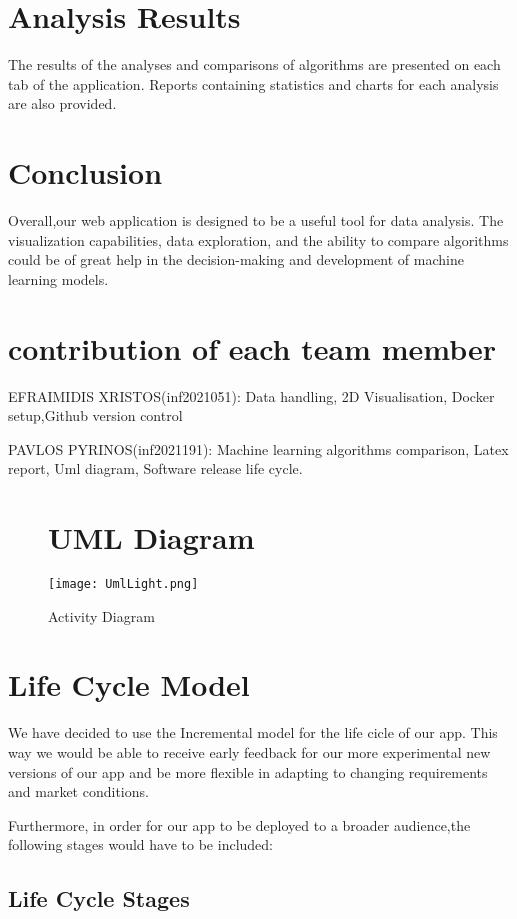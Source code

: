 \documentclass{article}
\begin{document}
\section{Analysis Results}
The results of the analyses and comparisons of algorithms are presented on each tab of the application. Reports containing statistics and charts for each analysis are also provided.

\section{Conclusion}
Overall,our web application is designed to be a useful tool for data analysis. The visualization capabilities, data exploration, and the ability to compare algorithms could be of great help in the decision-making and development of machine learning models.

\section{contribution of each team member}
EFRAIMIDIS XRISTOS(inf2021051): Data handling, 2D Visualisation, Docker setup,Github version control

PAVLOS PYRINOS(inf2021191): Machine learning algorithms comparison, Latex report, Uml diagram,
 Software release life cycle.

\begin{figure}[htbp]
    \section{UML Diagram}
    \centering
    \texttt{[image: UmlLight.png]}
    \caption{Activity Diagram}
    \label{fig:example}
\end{figure}

\section{Life Cycle Model}
We have decided to use the Incremental model for the life cicle of our app. This way we would be able to receive early feedback for our more experimental new versions of our app and be more flexible in adapting to changing requirements and market conditions. 

Furthermore, in order for our app to be deployed to a broader audience,the following stages would have to be included:

\subsection{Life Cycle Stages}
\end{document}
